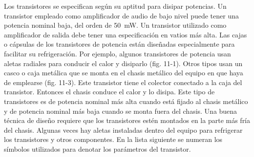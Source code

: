 \documentclass[a4paper,12pt]{article}
\begin{document}
Los transistores se especifican según su aptitud para disipar potencias. Un transistor empleado
como amplificador de audio de bajo nivel puede tener una potencia nominal baja, del orden de
\SI{50}{\milli\watt}. Un transistor utilizado como amplificador de salida debe tener una
especificación en vatios más alta. Las cajas o cápsulas de los transistores de potencia están
diseñadas especialmente para facilitar su refrigeración. Por ejemplo, algunos transistores de
potencia usan aletas radiales para conducir el calor y disiparlo (fig. 11-1). Otros tipos usan
un casco o caja metálica que se monta en el chasis metálico del equipo en que haya de emplearse
(fig. 11-3). Este transistor tiene el colector conectado a la caja del transistor. Entonces el
chasis conduce el calor y lo disipa. Este tipo de transistores es de potencia nominal más alta
cuando está fijado al chasis metálico y de potencia nominal más baja cuando se monta fuera del
chasis. Una buena técnica de diseño requiere que los transistores estén montados en la parte más
fría del chasis. Algunas veces hay aletas instaladas dentro del equipo para refrigerar los
transistores y otros componentes. En la lista siguiente se numeran los símbolos utilizados para
denotar los parámetros del transistor.
\end{document}
